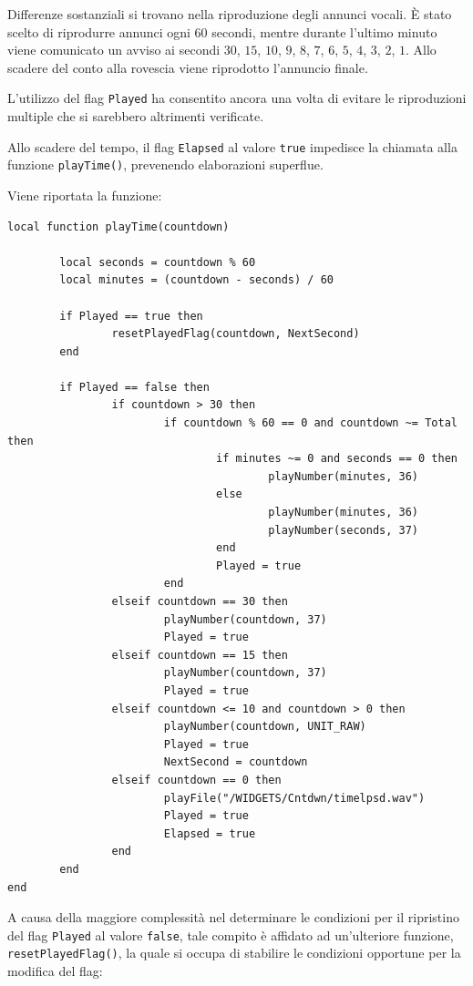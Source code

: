 \documentclass[a4paper, 12pt]{report} %
\begin{document}
Differenze sostanziali si trovano nella riproduzione degli annunci vocali. È stato scelto di riprodurre annunci ogni $60$ secondi, mentre durante l'ultimo minuto viene comunicato un avviso ai secondi $30$, $15$, $10$, $9$, $8$, $7$, $6$, $5$, $4$, $3$, $2$, $1$. Allo scadere del conto alla rovescia viene riprodotto l'annuncio finale.

L'utilizzo del flag \texttt{Played} ha consentito ancora una volta di evitare le riproduzioni multiple che si sarebbero altrimenti verificate. 

Allo scadere del tempo, il flag \texttt{Elapsed} al valore \texttt{true} impedisce la chiamata alla funzione \texttt{playTime()}, prevenendo elaborazioni superflue.

Viene riportata la funzione:

\begin{lstlisting}
local function playTime(countdown)

        local seconds = countdown % 60 
        local minutes = (countdown - seconds) / 60

        if Played == true then
                resetPlayedFlag(countdown, NextSecond)
        end

        if Played == false then
                if countdown > 30 then
                        if countdown % 60 == 0 and countdown ~= Total then
                                if minutes ~= 0 and seconds == 0 then
                                        playNumber(minutes, 36)
                                else
                                        playNumber(minutes, 36)
                                        playNumber(seconds, 37)
                                end
                                Played = true
                        end
                elseif countdown == 30 then
                        playNumber(countdown, 37)
                        Played = true
                elseif countdown == 15 then
                        playNumber(countdown, 37)
                        Played = true
                elseif countdown <= 10 and countdown > 0 then
                        playNumber(countdown, UNIT_RAW)
                        Played = true
                        NextSecond = countdown
                elseif countdown == 0 then
                        playFile("/WIDGETS/Cntdwn/timelpsd.wav")
                        Played = true
                        Elapsed = true
                end
        end
end
\end{lstlisting}

A causa della maggiore complessità nel determinare le condizioni per il ripristino del flag \texttt{Played} al valore \texttt{false}, tale compito è affidato ad un'ulteriore funzione, \texttt{resetPlayedFlag()}, la quale si occupa di stabilire le condizioni opportune per la modifica del flag:
\end{document}
